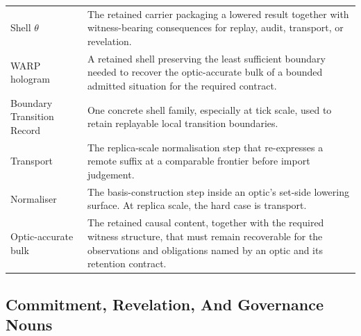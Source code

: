 \documentclass{aion}
\begin{document}
\begin{center}
\begin{tabularx}{\textwidth}{@{}>{\raggedright\arraybackslash}p{}X@{}}
		Shell \(\theta\)           & The retained carrier packaging a lowered result together with witness-bearing consequences for replay, audit, transport, or revelation.                                                    \\
		WARP hologram              & A retained shell preserving the least sufficient boundary needed to recover the optic-accurate bulk of a bounded admitted situation for the required contract.                             \\
		Boundary Transition Record & One concrete shell family, especially at tick scale, used to retain replayable local transition boundaries.                                                                                \\
		Transport                  & The replica-scale normalisation step that re-expresses a remote suffix at a comparable frontier before import judgement.                                                                   \\
		Normaliser                 & The basis-construction step inside an optic's set-side lowering surface. At replica scale, the hard case is transport.                                                                     \\
		Optic-accurate bulk        & The retained causal content, together with the required witness structure, that must remain recoverable for the observations and obligations named by an optic and its retention contract. \\
		\bottomrule
	\end{tabularx}
	\AIONTableStyleOff
\end{center}

\subsection{Commitment, Revelation, And Governance Nouns}
\end{document}
